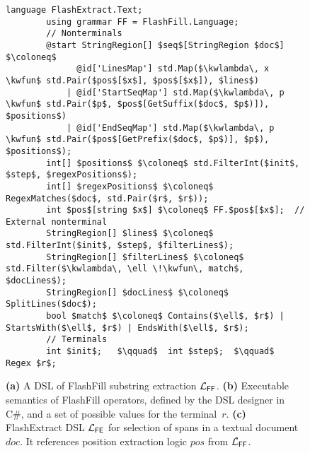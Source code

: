 \begin{figure*}
    \begin{lstlisting}[language=dsl,gobble=8,morekeywords={StringRegion,Regex}]
        language FlashExtract.Text;
        using grammar FF = FlashFill.Language;
        // Nonterminals
        @start StringRegion[] $seq$[StringRegion $doc$] $\coloneq$
              @id['LinesMap'] std.Map($\kwlambda\, x \kwfun$ std.Pair($pos$[$x$], $pos$[$x$]), $lines$)
            | @id['StartSeqMap'] std.Map($\kwlambda\, p \kwfun$ std.Pair($p$, $pos$[GetSuffix($doc$, $p$)]), $positions$)
            | @id['EndSeqMap'] std.Map($\kwlambda\, p \kwfun$ std.Pair($pos$[GetPrefix($doc$, $p$)], $p$), $positions$);
        int[] $positions$ $\coloneq$ std.FilterInt($init$, $step$, $regexPositions$);
        int[] $regexPositions$ $\coloneq$ RegexMatches($doc$, std.Pair($r$, $r$));
        int $pos$[string $x$] $\coloneq$ FF.$pos$[$x$];  // External nonterminal
        StringRegion[] $lines$ $\coloneq$ std.FilterInt($init$, $step$, $filterLines$);
        StringRegion[] $filterLines$ $\coloneq$ std.Filter($\kwlambda\, \ell \!\kwfun\, match$, $docLines$);
        StringRegion[] $docLines$ $\coloneq$ SplitLines($doc$);
        bool $match$ $\coloneq$ Contains($\ell$, $r$) | StartsWith($\ell$, $r$) | EndsWith($\ell$, $r$);
        // Terminals
        int $init$;   $\qquad$  int $step$;  $\qquad$  Regex $r$;
    \end{lstlisting}
    \caption{\textbf{(a)} A DSL of FlashFill substring extraction $\mathcal{L}_{\mathsf{FF}}$.
    \textbf{(b)} Executable semantics of FlashFill operators, defined by the DSL designer in C\#, and
    a set of possible values for the terminal~$r$.
    \textbf{(c)}
    FlashExtract DSL $\mathcal{L}_{\mathsf{FE}}$ for selection of spans in a textual document $doc$.
    It references position extraction logic $pos$ from $\mathcal{L}_{\mathsf{FF}}$. }
    \label{fig:dsl:flashfill}
\end{figure*}

